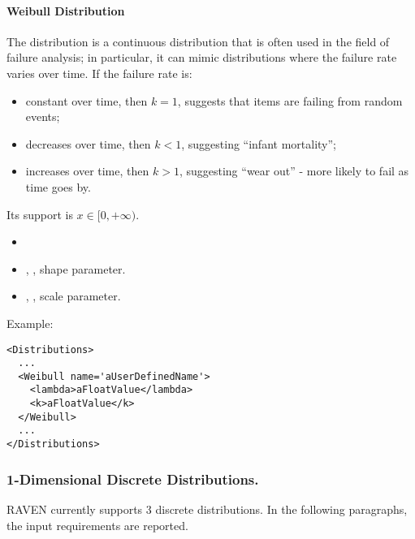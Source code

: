 \paragraph{Weibull Distribution}
\label{Weibull}
The  distribution is a continuous distribution that is often
used in the field of failure analysis; in particular, it can mimic distributions
where the failure rate varies over time.
%
If the failure rate is:
\vspace{-5mm}
\begin{itemize}
\itemsep0em
\item constant over time, then $k = 1$, suggests that items are failing from
  random events;
\item decreases over time, then $k < 1$, suggesting ``infant mortality''; 
\item increases over time, then $k > 1$, suggesting ``wear out'' - more likely
  to fail as time goes by.
\end{itemize}
\vspace{-5mm}
 Its support is $x \in [0, +\infty)$.

%
\attrIntro
\vspace{-5mm}
\begin{itemize}
\itemsep0em
\item \nameDescription  
\end{itemize}
\vspace{-5mm}
\subnodesIntro
\begin{itemize}
\item {}, , shape parameter.
\item {}, , scale parameter.
\end{itemize}

Example:
\begin{lstlisting}[style=XML]
<Distributions>
  ...
  <Weibull name='aUserDefinedName'>
    <lambda>aFloatValue</lambda>
    <k>aFloatValue</k>
  </Weibull>
  ...
</Distributions>
\end{lstlisting}

\subsubsection{1-Dimensional Discrete Distributions.}
\label{subsubsec:1DDiscrete}
RAVEN currently supports 3 discrete distributions.
%
In the following paragraphs, the input requirements are reported.


